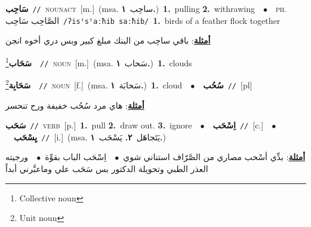 \documentclass[10pt,a4paper,twoside]{article} %
\begin{document}
\begin{multicols}{2}
{\setlength\topsep{0pt}\textbf{\foreignlanguage{arabic}{سَاحِب}}\ {\color{gray}\texttt{//}\color{black}}\ \textsc{noun\textunderscore act}\ [m.]\ \color{gray}(msa. \foreignlanguage{arabic}{ساحِب}~\foreignlanguage{arabic}{\textbf{١.}})\color{black}\ \textbf{1.}~pulling  \textbf{2.}~withrawing\ \ $\bullet$\ \ \textsc{ph.} \color{gray} \foreignlanguage{arabic}{الصَّاحِب سَاحِب}\color{black}\ {\color{gray}\texttt{/{\sffamily ʔisˤsˤaːħib saːħib}/}\color{black}}\ \textbf{1.}~birds of a feather flock together\  \begin{flushright}\color{gray}\foreignlanguage{arabic}{\textbf{\underline{\foreignlanguage{arabic}{أمثلة}}}: باقي ساحِب من البنك مبلغ كبير وبس دري أخوه انجن}\end{flushright}\color{black}} \vspace{2mm}

{\setlength\topsep{0pt}\textbf{\foreignlanguage{arabic}{سَحَاب}}\footnote{Collective noun}\ \ {\color{gray}\texttt{//}\color{black}}\ \textsc{noun}\ [m.]\ \color{gray}(msa. \foreignlanguage{arabic}{سَحاب}~\foreignlanguage{arabic}{\textbf{١.}})\color{black}\ \textbf{1.}~clouds\ } \vspace{2mm}

{\setlength\topsep{0pt}\textbf{\foreignlanguage{arabic}{سَحَابِة}}\footnote{Unit noun}\ \ {\color{gray}\texttt{//}\color{black}}\ \textsc{noun}\ [f.]\ \color{gray}(msa. \foreignlanguage{arabic}{سَحابَة}~\foreignlanguage{arabic}{\textbf{١.}})\color{black}\ \textbf{1.}~cloud\ \ $\bullet$\ \ \setlength\topsep{0pt}\textbf{\foreignlanguage{arabic}{سُحُب}}\ {\color{gray}\texttt{//}\color{black}}\ [pl]\  \begin{flushright}\color{gray}\foreignlanguage{arabic}{\textbf{\underline{\foreignlanguage{arabic}{أمثلة}}}: هاي مرد سُحُب خفيفة ورح تنحسر}\end{flushright}\color{black}} \vspace{2mm}

{\setlength\topsep{0pt}\textbf{\foreignlanguage{arabic}{سَحَب}}\ {\color{gray}\texttt{//}\color{black}}\ \textsc{verb}\ [p.]\ \textbf{1.}~pull  \textbf{2.}~draw out.  \textbf{3.}~ignore\ \ $\bullet$\ \ \setlength\topsep{0pt}\textbf{\foreignlanguage{arabic}{اِسْحَب}}\ {\color{gray}\texttt{//}\color{black}}\ [c.]\ \ $\bullet$\ \ \setlength\topsep{0pt}\textbf{\foreignlanguage{arabic}{يِسْحَب}}\ {\color{gray}\texttt{//}\color{black}}\ [i.]\ \color{gray}(msa. \foreignlanguage{arabic}{يَتَجاهَل}~\foreignlanguage{arabic}{\textbf{٢.}}  \foreignlanguage{arabic}{يَسْحَب}~\foreignlanguage{arabic}{\textbf{١.}})\color{black}\  \begin{flushright}\color{gray}\foreignlanguage{arabic}{\textbf{\underline{\foreignlanguage{arabic}{أمثلة}}}: بدِّي أسْحب مصاري من الصَّرّاف استناني شوي\ $\bullet$\ \  اِسْحَب الباب بقوِّة\ $\bullet$\ \  ورجيته العذر الطبي وتحويلة الدكتور بس سَحَب علي وماعبَّرني أبداً}\end{flushright}\color{black}} \vspace{2mm}


\end{multicols}
\end{document}
